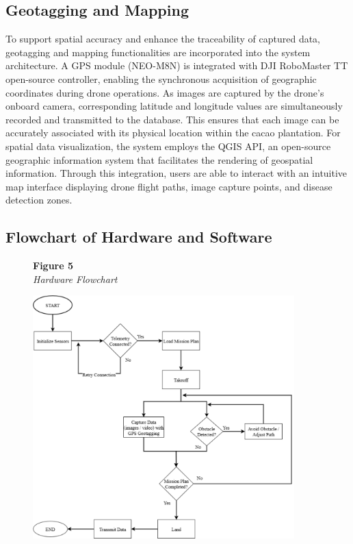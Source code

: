 	\subsection{Geotagging and Mapping}
	To support spatial accuracy and enhance the traceability of captured data, geotagging and mapping functionalities are incorporated into the system architecture. A GPS module (NEO-M8N) is integrated with DJI RoboMaster TT open-source controller, enabling the synchronous acquisition of geographic coordinates during drone operations. As images are captured by the drone’s onboard camera, corresponding latitude and longitude values are simultaneously recorded and transmitted to the database. This ensures that each image can be accurately associated with its physical location within the cacao plantation. For spatial data visualization, the system employs the QGIS API, an open-source geographic information system that facilitates the rendering of geospatial information. Through this integration, users are able to interact with an intuitive map interface displaying drone flight paths, image capture points, and disease detection zones.
	
	\subsection{Flowchart of Hardware and Software}
	
	\begin{figure}[H]
		\raggedright
		\textbf{Figure 5} \\ %
		\textit{Hardware Flowchart} %
		
		\vspace{0.5em}
		\centering
		\includegraphics[width=0.9\textwidth]{figures/HardFlow.pdf} %
		
		\vspace{0.5em}
		\raggedright
		
		\label{fig:HardFlow}
	\end{figure}
	

